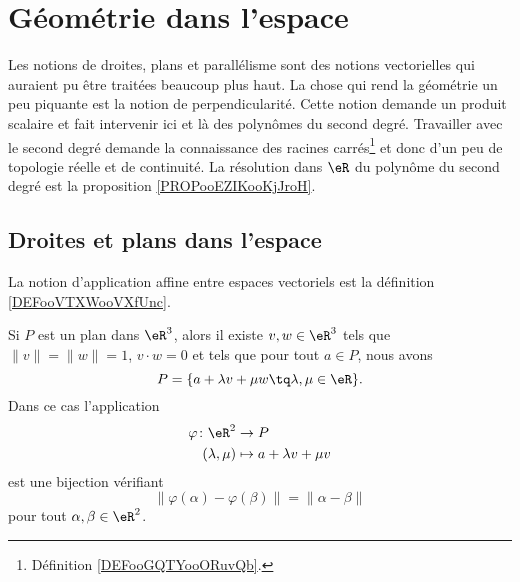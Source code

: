 \section{Géométrie dans l'espace}

\begin{normaltext}
	Les notions de droites, plans et parallélisme sont des notions vectorielles qui auraient pu être traitées beaucoup plus haut. La chose qui rend la géométrie un peu piquante est la notion de perpendicularité. Cette notion demande un produit scalaire et fait intervenir ici et là des polynômes du second degré. Travailler avec le second degré demande la connaissance des racines carrés\footnote{Définition \ref{DEFooGQTYooORuvQb}.} et donc d'un peu de topologie réelle et de continuité. La résolution dans \( \eR\) du polynôme du second degré est la proposition \ref{PROPooEZIKooKjJroH}.
\end{normaltext}

\subsection{Droites et plans dans l'espace}

La notion d'application affine entre espaces vectoriels est la définition \ref{DEFooVTXWooVXfUnc}.

\begin{proposition}	\label{PROPooONJHooDArmPT}
	Si \( P\) est un plan dans \( \eR^3\), alors il existe \( v,w\in \eR^3\) tels que \( \| v \|=\| w \|=1\), \( v\cdot w=0\) et tels que pour tout \( a\in P\), nous avons
	\begin{equation}
		P=\{ a+\lambda v+\mu w\tq \lambda,\mu\in \eR \}.
	\end{equation}
	Dans ce cas l'application
	\begin{equation}
		\begin{aligned}
			\varphi\colon \eR^2 & \to P                     \\
			(\lambda,\mu)       & \mapsto a+\lambda v+\mu v
		\end{aligned}
	\end{equation}
	est une bijection vérifiant
	\begin{equation}
		\| \varphi(\alpha)-\varphi(\beta) \|=\| \alpha-\beta \|
	\end{equation}
	pour tout \( \alpha,\beta\in \eR^2\).
\end{proposition}

